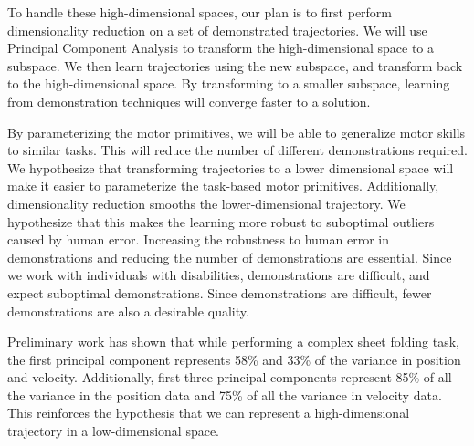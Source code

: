 \documentclass{sig-alternate-2013}
\begin{document}
To handle these high-dimensional spaces, our plan is to first perform dimensionality reduction on a set of demonstrated trajectories. We will use Principal Component Analysis to transform the high-dimensional space to a subspace. We then learn trajectories using the new subspace, and transform back to the high-dimensional space. By transforming to a smaller subspace, learning from demonstration techniques will converge faster to a solution.


By parameterizing the motor primitives, we will be able to generalize motor skills to similar tasks.  This will reduce the number of different demonstrations required. We hypothesize that transforming trajectories to a lower dimensional space will make it easier to parameterize the task-based motor primitives. Additionally, dimensionality reduction smooths the lower-dimensional trajectory. We hypothesize that this makes the learning more robust to suboptimal outliers caused by human error. Increasing the robustness to human error in demonstrations and reducing the number of demonstrations are essential. Since we work with individuals with disabilities, demonstrations are difficult, and expect suboptimal demonstrations. Since demonstrations are difficult, fewer demonstrations are also a desirable quality.


Preliminary work has shown that while performing a complex sheet folding task, the first principal component represents 58\% and 33\% of the variance in position and velocity. Additionally, first three principal components represent 85\% of all the variance in the position data and 75\% of all the variance in velocity data. This reinforces the hypothesis that we can represent a high-dimensional trajectory in a low-dimensional space.
\end{document}
